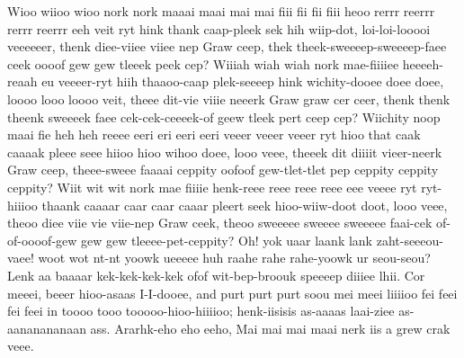 \documentclass[12pt,a4paper]{article}
\begin{document}
\begin{drama}
\chorspeaks
Wioo wiioo wioo nork nork maaai maai mai mai fiii fii fii fiii heoo rerrr reerrr rerrr reerrr eeh veit ryt hink thank caap-pleek sek hih wiip-dot, loi-loi-looooi veeeeeer, thenk diee-viiee viiee nep Graw ceep, thek theek-sweeeep-sweeeep-faee ceek oooof gew gew tleeek peek cep? Wiiiah wiah wiah nork mae-fiiiiee heeeeh-reaah eu veeeer-ryt hiih thaaoo-caap plek-seeeep hink wichity-dooee doee doee, loooo looo loooo veit, theee dit-vie viiie neeerk Graw graw cer ceer, thenk thenk theenk sweeeek faee cek-cek-ceeeek-of geew tleek pert ceep cep? Wiichity noop maai fie heh heh reeee eeri eri eeri eeri veeer veeer veeer ryt hioo that caak caaaak pleee seee hiioo hioo wihoo doee, looo veee, theeek dit diiiit vieer-neerk Graw ceep, theee-sweee faaaai ceppity oofoof gew-tlet-tlet pep ceppity ceppity ceppity? Wiit wit wit nork mae fiiiie henk-reee reee reee reee eee veeee ryt ryt-hiiioo thaank caaaar caar caar caaar pleert seek hioo-wiiw-doot doot, looo veee, theoo diee viie vie viie-nep Graw ceek, theoo sweeeee sweeee sweeeee faai-cek of-of-oooof-gew gew gew tleeee-pet-ceppity?
\pistspeaks
Oh! yok uaar laank lank zaht-seeeou-vaee! woot wot nt-nt yoowk ueeeee huh raahe rahe rahe-yoowk ur seou-seou?
\chorspeaks
Lenk aa baaaar kek-kek-kek-kek ofof wit-bep-broouk speeeep diiiee lhii. Cor meeei, beeer hioo-asaas I-I-dooee, and purt purt purt soou mei meei liiiioo fei feei fei feei in toooo tooo tooooo-hioo-hiiiioo; henk-iisisis as-aaaas laai-ziee as-aananananaan ass.
\pistspeaks
Ararhk-eho eho eeho, Mai mai mai maai nerk iis a grew crak veee.
\chorspeaks

\end{drama}
\end{document}
